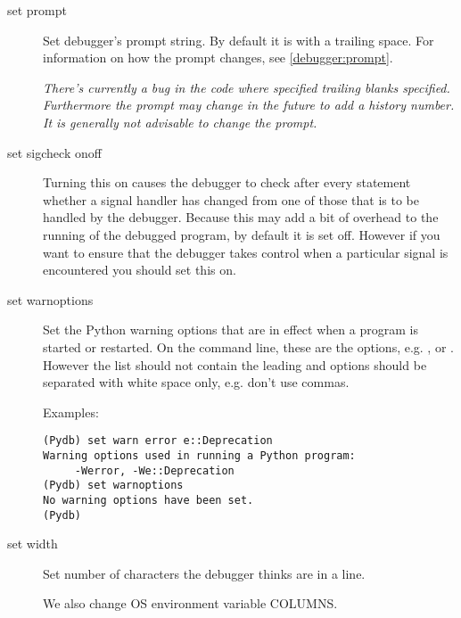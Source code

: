 \begin{description}
\item[set prompt ]\label{command:prompt}

Set debugger's prompt string. By default it is  with
a trailing space. For information on how the prompt
changes, see \ref{debugger:prompt}.

\emph{There's currently a bug in the code where specified trailing
blanks specified. Furthermore the prompt may change in the future to
add a history number. It is generally not advisable to change the
prompt.}

\item[set sigcheck on\code{\Large{|}}off]\label{command:sigwatch}

Turning this on causes the debugger to check after every statement
whether a signal handler has changed from one of those that is to be
handled by the debugger. Because this may add a bit of overhead to the
running of the debugged program, by default it is set off. However if
you want to ensure that the debugger takes control when a particular
signal is encountered you should set this on.

%

\item[set warnoptions ]\label{command:warnopts}

Set the Python warning options that are in effect when a program is started
or restarted. On the command line, these are the  options,
e.g. , or . However the list
should not contain the leading  and options should be
separated with white space only, e.g. don't use commas. 

Examples:
\begin{verbatim}
(Pydb) set warn error e::Deprecation
Warning options used in running a Python program:
	 -Werror, -We::Deprecation
(Pydb) set warnoptions
No warning options have been set.
(Pydb) 
\end{verbatim}

\item[set width {}]\label{command:width}

Set number of characters the debugger thinks are in a line.

We also change OS environment variable COLUMNS. 
\end{description}

